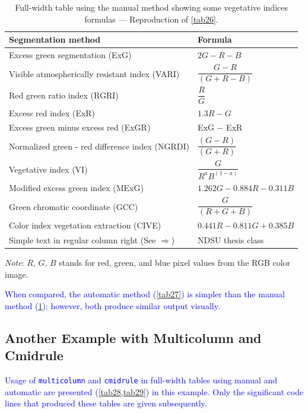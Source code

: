 \documentclass[phd,showgrids]{ndsu-thesis-2022}
\newcommand\italk[1]{\textcolor{blue}{#1}}  %
\newcommand\vb[1]{\textcolor{blue}{\texttt{#1}}}%
\begin{document}
\begin{table}[t]
\caption{Full-width table using the manual method showing some vegetative indices formulas --- Reproduction of \cref{tab26}.}
\setlength{\tabcolsep}{7ex}
\begin{tabular}{@{\:}l l@{\:}}
\toprule
Segmentation method  & Formula  \\
\midrule
Excess green segmentation (ExG)    				& $2G - R - B$\\[1ex]
Visible atmospherically resistant index (VARI) 		& $\dfrac{{G - R}}
{(G + R - B)}$ \\[2ex]
Red green ratio index (RGRI) 					& $\dfrac{R}{G}$\\[2ex]
Excess red index (ExR) 						& $1.3R - G$\\[2ex]
Excess green minus excess red (ExGR) 			& \text ExG $-$ ExR\\[2ex]
Normalized green - red difference index (NGRDI)	& $\dfrac{(G - R)}{(G + R)}$\\[2ex]
Vegetative index (VI) 						& $\dfrac{G}{R^a B^{(1-a)}}$\\[3ex]
Modified excess green index (MExG) 			& $ 1.262G - 0.884R - 0.311B$\\[2ex]
Green chromatic coordinate (GCC) 				& $\dfrac{G}{(R + G + B)}$\\[2ex]
Color index vegetation extraction (CIVE) 			& $0.441R - 0.811G + 0.385B$\\[2ex]
Simple text in regular column right (See $\Rightarrow$) & NDSU thesis class\\
\bottomrule
\end{tabular}
\begin{tablenotes}[flushleft]
\footnotesize
\item \hspace{-1ex} \emph{Note}: $R$, $G$, $B$ stands for red, green, and blue pixel values from the RGB color image.
\label{tab28}
\end{tablenotes}
\end{table}

\italk{When compared, the automatic method (\cref{tab27}) is simpler than the manual method (\cref{tab28}); however, both produce similar output visually.} 

\kant[9]
\subsection{Another Example with Multicolumn and Cmidrule}
\italk{Usage of \vb{multicolumn} and \vb{cmidrule} in full-width tables using manual and automatic are presented (\cref{tab28,tab29}) in this example. Only the significant code lines that produced these tables are given subsequently.} 
\end{document}
